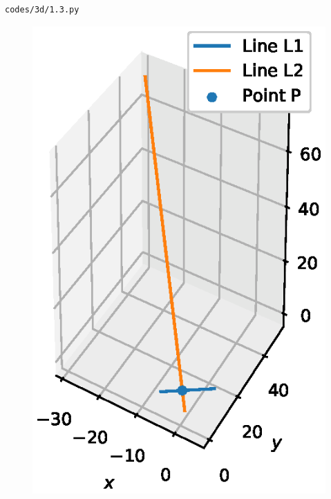 \begin{enumerate}[label=\arabic*.,ref=\thesubsection.\theenumi]
\begin{lstlisting}
codes/3d/1.3.py
\end{lstlisting}
\begin{figure}[!ht]
\centering
\includegraphics[width=\columnwidth]{./3d/figs/1.3.eps}
\caption{}
\label{fig:1.3}
\end{figure}
\end{enumerate}
